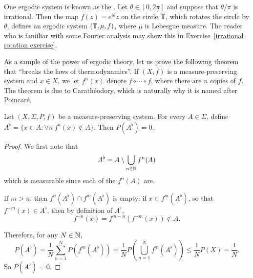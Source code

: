 \begin{example}
One ergodic system is known as the .
Let $\theta \in [0, 2\pi]$ and suppose that $\theta/\pi$ is irrational.
Then the map $f(z) = e^{i\theta}z$ on the circle $\mathbb{T}$, which rotates the circle by $\theta$, defines an ergodic system $(\mathbb{T}, \mu, f)$, where $\mu$ is Lebesgue measure.
The reader who is familiar with some Fourier analysis may show this in Exercise~\ref{irrational rotation exercise}.
\end{example}

\begin{subsec}
As a sample of the power of ergodic theory, let us prove the following theorem that ``breaks the laws of thermodynamics''.
If $(X, f)$ is a measure-preserving system and $x \in X$, we let $f^{n}(x)$ denote $f \circ \cdots \circ f$, where there are $n$ copies of $f$.
The theorem is due to Carathéodory, which is naturally why it is named after Poincar\'e.
\end{subsec}

\begin{theorem}
Let $(X, \Sigma, P, f)$ be a measure-preserving system.
For every $A \in \Sigma$, define $A^{\flat} = \{x \in A: \forall n~f^{n}(x) \notin A\}$.
Then $P(A^{\flat}) = 0$.
\end{theorem}
\begin{proof}
We first note that
\[A^{\flat} = A \setminus \bigcup_{n \in \mathbb{N}} f^{n}(A)\]
which is measurable since each of the $f^{n}(A)$ are.

If $m > n$, then $f^{n}(A^{\flat}) \cap f^{m}(A^{\flat})$ is empty: if $x \in f^{m}(A^{\flat})$, so that $f^{-m}(x) \in A^{\flat}$, then by definition of $A^{\flat}$,
\[f^{-n}(x) = f^{m-n}(f^{-m}(x)) \notin A.\]

Therefore, for any $N \in \mathbb{N}$,
\[P(A^{\flat}) = \frac{1}{N} \sum_{n=1}^{N} P(f^{m}(A^{\flat})) = \frac{1}{N} P\left(\bigcup_{n=1}^{N} f^{m}(A^{\flat})\right) \leq \frac{1}{N} P(X) = \frac{1}{N}.\]
So $P(A^{\flat}) = 0$.
\end{proof}

